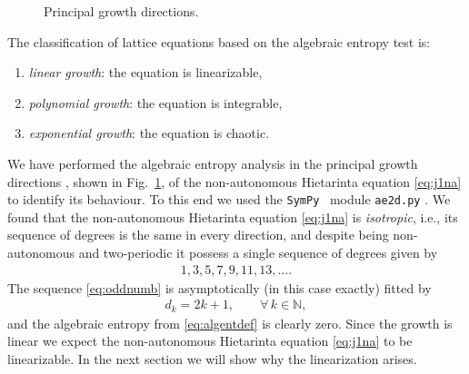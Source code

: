 \documentclass[pdftex]{sigma}
\numberwithin{equation}{section}
\newcommand{\N}{\mathbb{N}}
\newcommand{\SymPy}{\texttt{SymPy}}
\begin{document}
\begin{figure}[hbt]
 \centering
 \caption{Principal growth directions.}
 \label{fig:princgrowth}
\end{figure}

The classif\/ication of lattice equations based on the algebraic
entropy test is:
\begin{enumerate}\itemsep=0pt
 \item[] {\it linear growth}: the equation is linearizable,
 \item[] {\it polynomial growth}: the equation is integrable,
 \item[] {\it exponential growth}: the equation is chaotic.
\end{enumerate}

We have performed the algebraic entropy analysis
in the principal growth directions \cite{Viallet2006},
shown in Fig.~\ref{fig:princgrowth},
of the non-autonomous Hietarinta equation \eqref{eq:j1na}
to identify its behaviour.
To this end we used the \SymPy~\cite{sympy} module
\verb!ae2d.py! \cite{GubbiottiPhD2017, GubHay}.
We found that the non-autonomous Hietarinta equation
\eqref{eq:j1na} is \emph{isotropic}, i.e., its sequence
of degrees is the same in every direction, and
despite being non-autonomous and two-periodic
it possess a single sequence of degrees
given by
\begin{gather}
 1,3,5,7,9,11,13,\dots. \label{eq:oddnumb}
\end{gather}
The sequence \eqref{eq:oddnumb} is asymptotically (in this case exactly) f\/itted by
\begin{gather*}
 d_{k} = 2k +1, \qquad \forall\, k \in\N, %
\end{gather*}
and the algebraic entropy from \eqref{eq:algentdef}
is clearly zero.
Since the growth is linear we expect the non-autonomous Hietarinta
equation \eqref{eq:j1na} to be linearizable.
In the next section we will show why the linearization
arises.
\end{document}
